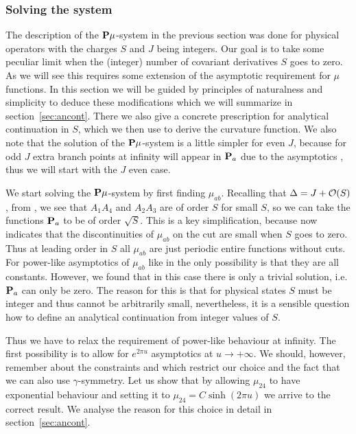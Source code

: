 \subsubsection{Solving the system}
\label{sec:slope_pmu_solve}

The description of the ${\bf P}\mu$-system in the previous section was done for physical operators with the charges $S$ and $J$ being integers. 
Our goal is to take some peculiar limit when the (integer) number of covariant derivatives $S$ goes to zero.  
As we will see this requires some extension of the asymptotic requirement for $\mu$ functions.
In this section we will be guided by principles of naturalness and simplicity to deduce these modifications which we will summarize in section~\ref{sec:ancont}. 
There we also give a concrete prescription for analytical continuation in $S$, which we then use to derive the curvature function.
We also note that the solution of the ${\bf P}\mu$-system is a little simpler for even $J$, because for odd $J$ extra branch points at infinity will appear in ${\bf P}_a$ due to the asymptotics , thus we will start with the $J$ even case.

We start solving the ${\bf P}\mu$-system by first finding $\mu_{ab}$. 
Recalling that $\Delta=J+{\cal O}(S)$, from ,  we see that $A_1A_4$ and $A_2A_3$ are of order $S$ for small $S$, so we can take the functions ${\bf P}_a$ to be of order $\sqrt{S}$. 
This is a key simplification, because now  indicates that the discontinuities of $\mu_{ab}$ on the cut are small when $S$ goes to zero. 
Thus at leading order in $S$ all $\mu_{ab}$ are just periodic entire functions without cuts.
For power-like asymptotics of $\mu_{ab}$ like in  the only possibility is that they are all constants.
However, we found that in this case there is only a trivial solution, i.e. ${\bf P}_a$ can only be zero.
The reason for this is that for physical states $S$ must be integer and thus cannot be arbitrarily small, nevertheless, it is a sensible question how to define an analytical continuation from integer values of $S$.

Thus we have to relax the requirement of power-like behaviour at infinity. The first possibility is
to allow for $e^{2\pi u}$ asymptotics at $u\to +\infty$.
We should, however, remember about the constraints  and  which restrict our choice and the fact that we can also use $\gamma$-symmetry.
Let us show that by allowing $\mu_{24}$ to have exponential behaviour and setting it to $\mu_{24}=C\sinh(2\pi u)$ we arrive to the correct result. 
We analyse the reason for this choice in detail in section~\ref{sec:ancont}.

